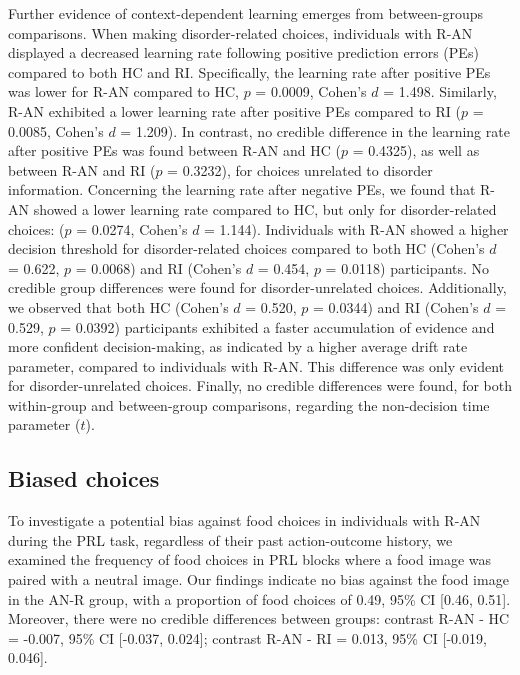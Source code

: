 \documentclass[
  man,floatsintext]{apa6}
\begin{document}
Further evidence of context-dependent learning emerges from between-groups comparisons. When making disorder-related choices, individuals with R-AN displayed a decreased learning rate following positive prediction errors (PEs) compared to both HC and RI. Specifically, the learning rate after positive PEs was lower for R-AN compared to HC, \(p\) = 0.0009, Cohen's \(d\) = 1.498. Similarly, R-AN exhibited a lower learning rate after positive PEs compared to RI (\(p\) = 0.0085, Cohen's \(d\) = 1.209). In contrast, no credible difference in the learning rate after positive PEs was found between R-AN and HC (\(p\) = 0.4325), as well as between R-AN and RI (\(p\) = 0.3232), for choices unrelated to disorder information. Concerning the learning rate after negative PEs, we found that R-AN showed a lower learning rate compared to HC, but only for disorder-related choices: (\(p\) = 0.0274, Cohen's \(d\) = 1.144). Individuals with R-AN showed a higher decision threshold for disorder-related choices compared to both HC (Cohen's \(d\) = 0.622, \(p\) = 0.0068) and RI (Cohen's \(d\) = 0.454, \(p\) = 0.0118) participants. No credible group differences were found for disorder-unrelated choices. Additionally, we observed that both HC (Cohen's \(d\) = 0.520, \(p\) = 0.0344) and RI (Cohen's \(d\) = 0.529, \(p\) = 0.0392) participants exhibited a faster accumulation of evidence and more confident decision-making, as indicated by a higher average drift rate parameter, compared to individuals with R-AN. This difference was only evident for disorder-unrelated choices. Finally, no credible differences were found, for both within-group and between-group comparisons, regarding the non-decision time parameter (\(t\)).

\hypertarget{biased-choices}{%
\subsection{Biased choices}\label{biased-choices}}

To investigate a potential bias against food choices in individuals with R-AN during the PRL task, regardless of their past action-outcome history, we examined the frequency of food choices in PRL blocks where a food image was paired with a neutral image. Our findings indicate no bias against the food image in the AN-R group, with a proportion of food choices of 0.49, 95\% CI {[}0.46, 0.51{]}. Moreover, there were no credible differences between groups: contrast R-AN - HC = -0.007, 95\% CI {[}-0.037, 0.024{]}; contrast R-AN - RI = 0.013, 95\% CI {[}-0.019, 0.046{]}.
\end{document}

